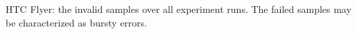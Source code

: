 HTC Flyer: the invalid samples over all experiment runs. The failed samples may be characterized as bursty errors.
